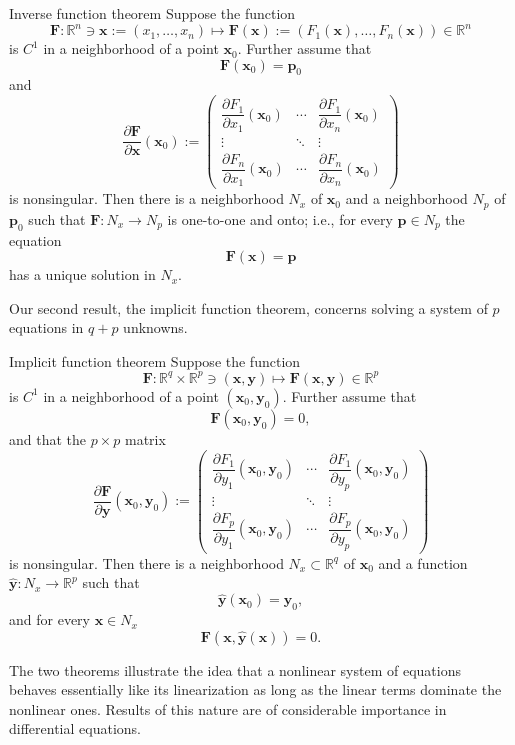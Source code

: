 \begin{Theorem}{Inverse function theorem}
\label{thm:inverse-function}
Suppose the function
\[
\bm{F}:\mathbb{R}^n\ni\bm{x}:=(x_1,\ldots,x_n)\mapsto\bm{F}(\bm{x}):=(F_1(\bm{x}),\ldots,F_n(\bm{x}))\in\mathbb{R}^n
\]
is $C^1$ in a neighborhood of a point $\bm{x}_0$. Further assume that
\[
\bm{F}(\bm{x}_0)=\bm{p}_0
\]
and
\[
\dfrac{\partial\bm{F}}{\partial\bm{x}}(\bm{x}_0):=
\begin{pmatrix}
\dfrac{\partial F_1}{\partial x_1}(\bm{x}_0)&\cdots&\dfrac{\partial F_1}{\partial x_n}(\bm{x}_0)\\
\vdots&\ddots&\vdots\\
\dfrac{\partial F_n}{\partial x_1}(\bm{x}_0)&\cdots&\dfrac{\partial F_n}{\partial x_n}(\bm{x}_0)
\end{pmatrix}
\]
is nonsingular. Then there is a neighborhood $N_x$ of $\bm{x}_0$ and a neighborhood $N_p$ of $\bm{p}_0$ such that $\bm{F}:N_x\to N_p$ is one-to-one and onto; i.e., for every $\bm{p}\in N_p$ the equation
\[
\bm{F}(\bm{x})=\bm{p}
\]
has a unique solution in $N_x$.
\end{Theorem}

Our second result, the implicit function theorem, concerns solving a system of $p$ equations in $q+p$ unknowns.

\begin{Theorem}{Implicit function theorem}
\label{thm:implicit-function}
Suppose the function
\[
\bm{F}:\mathbb{R}^q\times\mathbb{R}^p\ni(\bm{x},\bm{y})\mapsto\bm{F}(\bm{x},\bm{y})\in\mathbb{R}^p
\]
is $C^1$ in a neighborhood of a point $(\bm{x}_0,\bm{y}_0)$. Further assume that
\[
\bm{F}(\bm{x}_0,\bm{y}_0)=0,
\]
and that the $p\times p$ matrix
\[
\dfrac{\partial\bm{F}}{\partial\bm{y}}(\bm{x}_0,\bm{y}_0):=
\begin{pmatrix}
\dfrac{\partial F_1}{\partial y_1}(\bm{x}_0,\bm{y}_0)&\cdots&\dfrac{\partial F_1}{\partial y_p}(\bm{x}_0,\bm{y}_0)\\
\vdots&\ddots&\vdots\\
\dfrac{\partial F_p}{\partial y_1}(\bm{x}_0,\bm{y}_0)&\cdots&\dfrac{\partial F_p}{\partial y_p}(\bm{x}_0,\bm{y}_0)
\end{pmatrix}
\]
is nonsingular. Then there is a neighborhood $N_x\subset\mathbb{R}^q$ of $\bm{x}_0$ and a function $\hat{\bm{y}}:N_x\to\mathbb{R}^p$ such that
\[
\hat{\bm{y}}(\bm{x}_0)=\bm{y}_0,
\]
and for every $\bm{x}\in N_x$
\[
\bm{F}(\bm{x},\hat{\bm{y}}(\bm{x}))=0.
\]
\end{Theorem}

The two theorems illustrate the idea that a nonlinear system of equations behaves essentially like its linearization as long as the linear terms dominate the nonlinear ones. Results of this nature are of considerable importance in differential equations.

